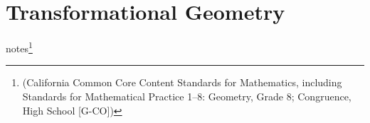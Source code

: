 \section[Transformational Geometry]{Transformational Geometry}





notes\footnote[4]{(California Common Core Content Standards for Mathematics, including Standards for Mathematical Practice
1–8: Geometry, Grade 8; Congruence, High School [G-CO])}